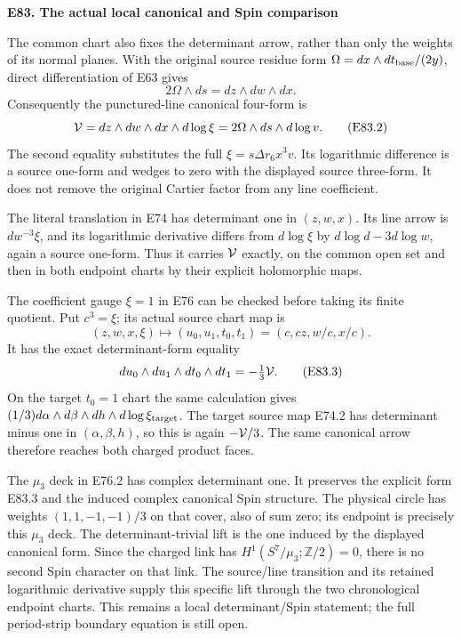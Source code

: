 \par

\medskip\noindent\textbf{E83. The actual local canonical and Spin comparison}

\par\nobreak

The common chart also fixes the determinant arrow, rather than only
the weights of its normal planes. With the original source residue
form \(\Omega=dx\wedge dt_{\rm base}/(2y)\), direct differentiation
of E63 gives
\[
       2\Omega\wedge ds=dz\wedge dw\wedge dx.     \tag{E83.1}
\]
Consequently the punctured-line canonical four-form is
\[
 {\cal V}=dz\wedge dw\wedge dx\wedge d\log\xi
             =2\Omega\wedge ds\wedge d\log v.    \tag{E83.2}
\]
The second equality substitutes the full
\(\xi=s\Delta r_6x^3v\). Its logarithmic difference is a
source one-form and wedges to zero with the displayed
source three-form. It does not remove the original Cartier
factor from any line coefficient.

The literal translation in E74 has determinant one in
\((z,w,x)\). Its line arrow is \(d w^{-3}\xi\), and its
logarithmic derivative differs from \(d\log\xi\) by
\(d\log d-3d\log w\), again a source one-form.
Thus it carries \({\cal V}\) exactly, on the common open
set and then in both endpoint charts by their explicit
holomorphic maps.

The coefficient gauge \(\xi=1\) in E76 can be checked
before taking its finite quotient. Put \(c^3=\xi\); its
actual source chart map is
\[
 (z,w,x,\xi)\longmapsto
       (u_0,u_1,t_0,t_1)=(c,cz,w/c,x/c).
\]
It has the exact determinant-form equality
\[
 du_0\wedge du_1\wedge dt_0\wedge dt_1
                       =-\tfrac13{\cal V}.     \tag{E83.3}
\]
On the target \(t_0=1\) chart the same calculation gives
\((1/3)d\alpha\wedge d\beta\wedge dh\wedge d\log\xi_{\rm target}\).
The target source map E74.2 has determinant minus one in
\((\alpha,\beta,h)\), so this is again
\(-{\cal V}/3\). The same canonical arrow therefore reaches
both charged product faces.

The \(\mu_3\) deck in E76.2 has complex determinant one.
It preserves the explicit form E83.3 and the induced
complex canonical Spin structure. The physical circle
has weights \((1,1,-1,-1)/3\) on that cover, also of sum
zero; its endpoint is precisely this \(\mu_3\) deck.
The determinant-trivial lift is the one induced by the
displayed canonical form. Since the charged link has
\(H^1(S^7/\mu_3;\mathbb Z/2)=0\), there is no second
Spin character on that link. The source/line transition
and its retained logarithmic derivative supply this
specific lift through the two chronological endpoint
charts. This remains a local determinant/Spin statement;
the full period-strip boundary equation is still open.

